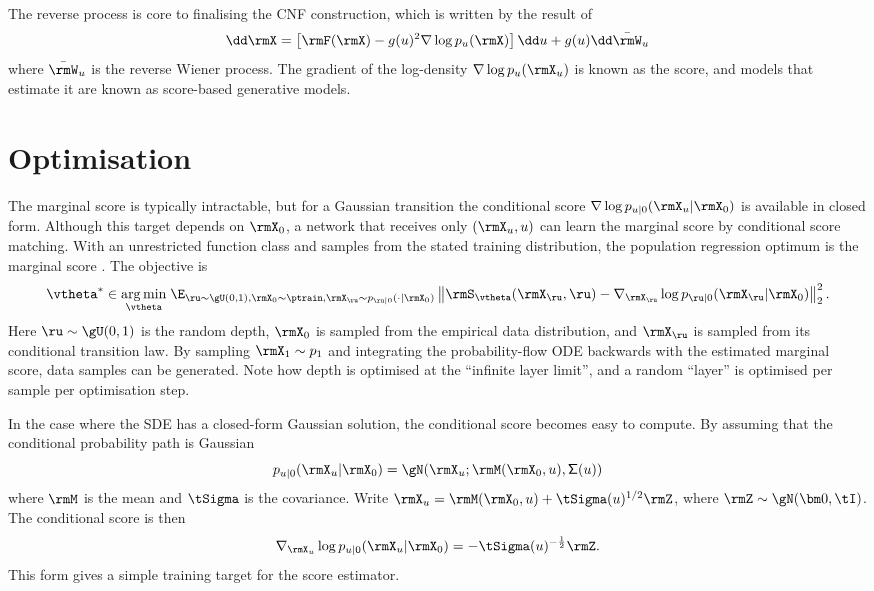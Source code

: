 The reverse process is core to finalising the CNF construction, which is written by the result of \cite{andersonReversetimeDiffusionEquation1982}
\[
\dd\rmX = \left[\rmF(\rmX) - g(u)^2\nabla\log p_u(\rmX)\right]\dd u + g(u)\dd\bar\rmW_u
\label{eq:sderev}
\]
where $\bar\rmW_u$ is the reverse Wiener process. The gradient of the log-density $\nabla\log p_u(\rmX_u)$ is known as the score, and models that estimate it are known as score-based generative models.

\section{Optimisation}

The marginal score is typically intractable, but for a Gaussian transition the conditional score $\nabla\log p_{u|0}(\rmX_u|\rmX_0)$ is available in closed form. Although this target depends on $\rmX_0$, a network that receives only $(\rmX_u,u)$ can learn the marginal score by conditional score matching. With an unrestricted function class and samples from the stated training distribution, the population regression optimum is the marginal score \citep{song2021sde}. The objective is
\[
\vtheta^\ast\in\underset{\vtheta}{\arg\min}\;\E_{\ru\sim\gU(0,1),\rmX_0\sim\ptrain,\rmX_\ru\sim p_{\ru|0}(\cdot|\rmX_0)}\left\lVert\rmS_\vtheta(\rmX_\ru,\ru)-\nabla_{\rmX_\ru}\log p_{\ru|0}(\rmX_\ru|\rmX_0)\right\rVert_2^2.
\]
Here $\ru\sim\gU(0,1)$ is the random depth, $\rmX_0$ is sampled from the empirical data distribution, and $\rmX_\ru$ is sampled from its conditional transition law.
By sampling $\rmX_1\sim p_1$ and integrating the probability-flow ODE backwards with the estimated marginal score, data samples can be generated. Note how depth is optimised at the ``infinite layer limit'', and a random ``layer'' is optimised per sample per optimisation step. 


In the case where the SDE has a closed-form Gaussian solution, the conditional score becomes easy to compute. By assuming that the conditional probability path is Gaussian
\[
p_{u|0}(\rmX_u|\rmX_0) = \gN(\rmX_u;\rmM(\rmX_0,u),\mathsf\Sigma(u))
\]
where $\rmM$ is the mean and $\tSigma$ is the covariance. Write
$\rmX_u=\rmM(\rmX_0,u)+\tSigma(u)^{1/2}\rmZ$, where $\rmZ\sim\gN(\bm0,\tI)$. The conditional score is then
\[
\nabla_{\rmX_u}\log p_{u|0}(\rmX_u|\rmX_0) = -\tSigma(u)^{-\frac{1}{2}}\rmZ.
\]
This form gives a simple training target for the score estimator.

